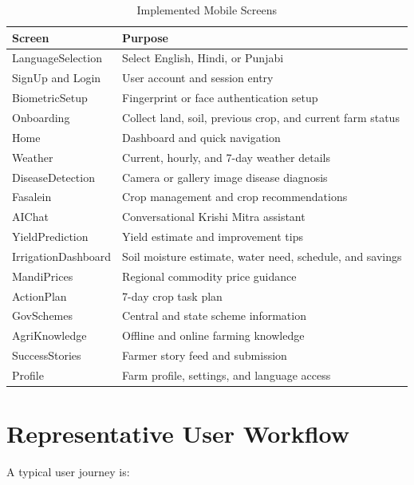 \documentclass[12pt,a4paper]{report}
\begin{document}
\begin{table}[H]
\centering
\caption{Implemented Mobile Screens}
\label{tab:screens}
\small
\begin{tabular}{p{4cm}p{9.5cm}}
\toprule
\textbf{Screen} & \textbf{Purpose} \\
\midrule
LanguageSelection & Select English, Hindi, or Punjabi \\
SignUp and Login & User account and session entry \\
BiometricSetup & Fingerprint or face authentication setup \\
Onboarding & Collect land, soil, previous crop, and current farm status \\
Home & Dashboard and quick navigation \\
Weather & Current, hourly, and 7-day weather details \\
DiseaseDetection & Camera or gallery image disease diagnosis \\
Fasalein & Crop management and crop recommendations \\
AIChat & Conversational Krishi Mitra assistant \\
YieldPrediction & Yield estimate and improvement tips \\
IrrigationDashboard & Soil moisture estimate, water need, schedule, and savings \\
MandiPrices & Regional commodity price guidance \\
ActionPlan & 7-day crop task plan \\
GovSchemes & Central and state scheme information \\
AgriKnowledge & Offline and online farming knowledge \\
SuccessStories & Farmer story feed and submission \\
Profile & Farm profile, settings, and language access \\
\bottomrule
\end{tabular}
\end{table}

\section{Representative User Workflow}

A typical user journey is:
\end{document}
